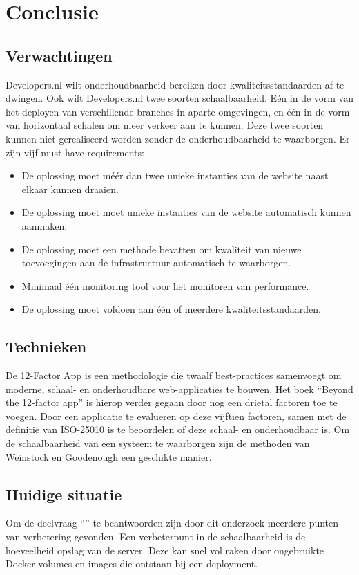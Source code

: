 \chapter{Conclusie}

\label{Chapter9}

\section{Verwachtingen}
Developers.nl wilt onderhoudbaarheid bereiken door kwaliteitsstandaarden af te dwingen. Ook wilt Developers.nl twee soorten schaalbaarheid. Eén in de vorm van het deployen van verschillende branches in aparte omgevingen, en één in de vorm van horizontaal schalen om meer verkeer aan te kunnen. Deze twee soorten kunnen niet gerealiseerd worden zonder de onderhoudbaarheid te waarborgen. Er zijn vijf must-have requirements:

\begin{itemize}
	\item De oplossing moet méér dan twee unieke instanties van de website naast elkaar kunnen draaien.
	\item De oplossing moet moet unieke instanties van de website automatisch kunnen aanmaken.
	\item De oplossing moet een methode bevatten om kwaliteit van nieuwe toevoegingen aan de infrastructuur automatisch te waarborgen.
	\item Minimaal één monitoring tool voor het monitoren van performance.
	\item De oplossing moet voldoen aan één of meerdere kwaliteitsstandaarden.
\end{itemize}

\section{Technieken}
De 12-Factor App is een methodologie die twaalf best-practices samenvoegt om moderne, schaal- en onderhoudbare web-applicaties te bouwen. Het boek \enquote{Beyond the 12-factor app} \parencite{Beyond12Factor} is hierop verder gegaan door nog een drietal factoren toe te voegen. Door een applicatie te evalueren op deze vijftien factoren, samen met de definitie van ISO-25010 \parencite{ISO25010} is te beoordelen of deze schaal- en onderhoudbaar is. Om de schaalbaarheid van een systeem te waarborgen zijn  de methoden van Weinstock en Goodenough \parencite{OnSystemScalability} een geschikte manier.

\section{Huidige situatie}
Om de deelvraag \enquote{\deelhuidig} te beantwoorden zijn door dit onderzoek meerdere punten van verbetering gevonden. Een verbeterpunt in de schaalbaarheid is de hoeveelheid opslag van de server. Deze kan snel vol raken door ongebruikte Docker volumes en images die ontstaan bij een deployment. 

